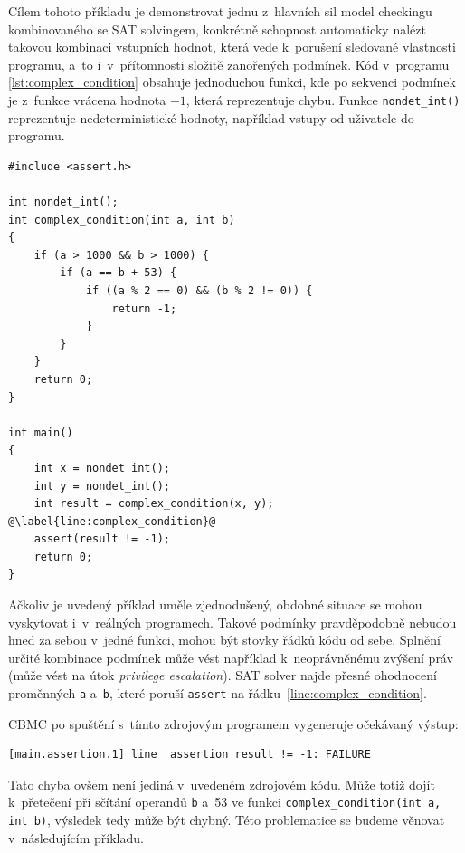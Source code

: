 \documentclass[a4paper, 11pt]{article}
\begin{document}
Cílem tohoto příkladu je demonstrovat jednu z~hlavních sil model checkingu kombinovaného se SAT solvingem, konkrétně schopnost automaticky nalézt takovou kombinaci vstupních hodnot, která vede k~porušení sledované vlastnosti programu, a~to i~v~přítomnosti složitě zanořených podmínek.
Kód v~programu \ref{lst:complex_condition} obsahuje jednoduchou funkci, kde po sekvenci podmínek je z~funkce vrácena hodnota $-1$, která reprezentuje chybu.
Funkce \texttt{nondet\_int()} reprezentuje nedeterministické hodnoty, například vstupy od uživatele do programu.
\begin{listing}[h]
    \caption{Porušení \texttt{assert}u po splnění několika komplexních podmínek.}
    \label{lst:complex_condition}
    \begin{verbatim}
#include <assert.h>

int nondet_int();
int complex_condition(int a, int b)
{
    if (a > 1000 && b > 1000) {
        if (a == b + 53) {
            if ((a % 2 == 0) && (b % 2 != 0)) {
                return -1;
            }
        }
    }
    return 0;
}

int main()
{
    int x = nondet_int();
    int y = nondet_int();
    int result = complex_condition(x, y); @\label{line:complex_condition}@
    assert(result != -1);
    return 0;
}  
    \end{verbatim}
\end{listing}

Ačkoliv je uvedený příklad uměle zjednodušený, obdobné situace se mohou vyskytovat i~v~reálných programech.
Takové podmínky pravděpodobně nebudou hned za sebou v~jedné funkci, mohou být stovky řádků kódu od sebe.
Splnění určité kombinace podmínek může vést například k~neoprávněnému zvýšení práv (může vést na útok \emph{privilege escalation}).
SAT solver najde přesné ohodnocení proměnných \texttt{a} a~\texttt{b}, které poruší \texttt{assert} na řádku~\ref{line:complex_condition}.

CBMC po spuštění s~tímto zdrojovým programem vygeneruje očekávaný výstup:
\begin{lstlisting}
[main.assertion.1] line  assertion result != -1: FAILURE
\end{lstlisting}

\noindent Tato chyba ovšem není jediná v~uvedeném zdrojovém kódu.
Může totiž dojít k~přetečení při sčítání operandů \texttt{b} a~53 ve funkci \texttt{complex\_condition(int a, int b)}, výsledek tedy může být chybný.
Této problematice se budeme věnovat v~následujícím příkladu.
\end{document}
